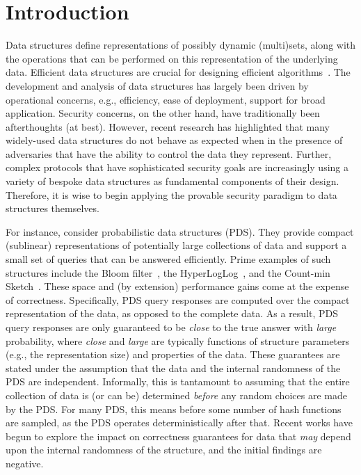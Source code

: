 \chapter{Introduction}


Data structures define representations of possibly dynamic (multi)sets, along with the operations that can be performed on this representation of the underlying data. Efficient data structures are crucial for designing efficient algorithms~\cite{clrs}. The development and analysis of data structures has largely been driven by operational concerns, e.g., efficiency, ease of deployment, support for broad application. Security concerns, on the other hand, have traditionally been afterthoughts (at best). However, recent research has highlighted that many widely-used data structures do not behave as expected when in the presence of adversaries that have the ability to control the data they represent. Further, complex protocols that have sophisticated security goals are increasingly using a variety of bespoke data structures as fundamental components of their design. Therefore, it is wise to begin applying the provable security paradigm to data structures themselves. 

For instance, consider probabilistic data structures (PDS). They provide compact (sublinear) representations of potentially large collections of data and support a small set of queries that can be answered efficiently. Prime examples of such structures include the Bloom filter~\cite{bloom1970space}, the HyperLogLog~\cite{flajolet2007hyperloglog}, and the Count-min Sketch~\cite{cormode2005improved}. These space and (by extension) performance gains come at the expense of correctness.  Specifically, PDS query responses are computed over the compact representation of the data, as opposed to the complete data.  As a result, PDS query responses are only guaranteed to be \emph{close} to the true answer with \emph{large} probability, where \emph{close} and \emph{large} are typically functions of structure parameters (e.g., the representation size) and properties of the data. These guarantees are stated under the assumption that the data and the internal randomness of the PDS are independent.  Informally, this is tantamount to assuming  that the entire collection of data is (or can be) determined \emph{before} any random choices are made by the PDS.  For many PDS, this means before some number of hash functions are sampled, as the PDS operates deterministically after that. Recent works have begun to explore the impact on correctness guarantees for data that \emph{may} depend upon the internal randomness of the structure, and the initial findings are negative. 

